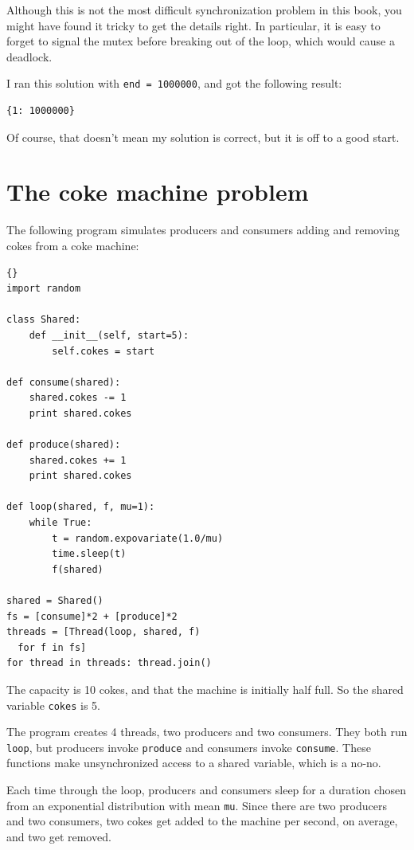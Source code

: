 \documentclass{book}
\begin{document}
Although this is not the most difficult synchronization problem
in this book, you might have found it tricky to get the details
right.  In particular, it is easy to forget to signal the mutex
before breaking out of the loop, which would cause a deadlock.

I ran this solution with {\tt end = 1000000}, and got the
following result:

\begin{verbatim}
{1: 1000000}
\end{verbatim}

Of course, that doesn't mean my solution is correct, but it is
off to a good start.



\section {The coke machine problem}

The following program simulates producers and consumers
adding and removing cokes from a coke machine:
\begin{lstlisting}[title={}]{}
import random

class Shared:
    def __init__(self, start=5):
        self.cokes = start

def consume(shared):
    shared.cokes -= 1
    print shared.cokes

def produce(shared):
    shared.cokes += 1
    print shared.cokes

def loop(shared, f, mu=1):
    while True:
        t = random.expovariate(1.0/mu)
        time.sleep(t)
        f(shared)

shared = Shared()
fs = [consume]*2 + [produce]*2 
threads = [Thread(loop, shared, f) 
  for f in fs]
for thread in threads: thread.join()
\end{lstlisting}

The capacity is 10 cokes, and that the machine is initially
half full.  So the shared variable {\tt cokes} is 5.

The program creates 4 threads, two producers and two consumers.
They both run {\tt loop}, but producers invoke {\tt produce}
and consumers invoke {\tt consume}.  These functions make
unsynchronized access to a shared variable, which is a no-no.

Each time through the loop, producers and consumers sleep for a
duration chosen from an exponential distribution with mean {\tt mu}.
Since there are two producers and two consumers, two cokes get added
to the machine per second, on average, and two get removed.
\end{document}
